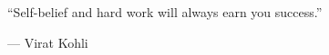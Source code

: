 
“Self-belief and hard work will always earn you success.” \\
\begin{footnotesize}
--- Virat Kohli  
\end{footnotesize}